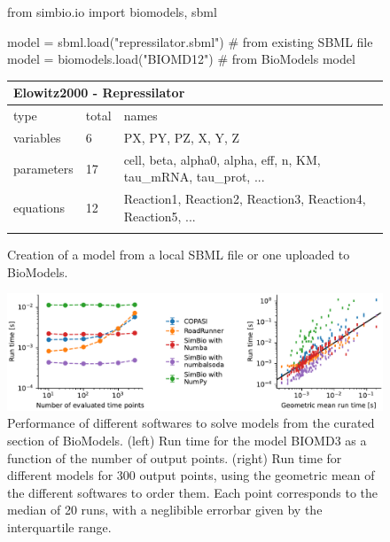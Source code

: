 \documentclass[namedate,numsec,webpdf,modern,large]{oup-authoring-template}
\theoremstyle{thmstyleone}%
\theoremstyle{thmstyletwo}%
\theoremstyle{thmstylethree}%
\newenvironment{CodeInput}{\begin{tcolorbox}[title=input,boxrule=0pt]}{\end{tcolorbox}}
\newenvironment{CodeOutput}{\begin{tcolorbox}[title=output,boxrule=0pt]}{\end{tcolorbox}}
\newcommand{\KeywordTok}[1]{\textcolor[rgb]{0.00,0.13,1.00}{#1}}
\newcommand{\ClassTok}[1]{\textcolor[rgb]{0.27,0.56,0.65}{#1}}
\newcommand{\OperatorTok}[1]{\textcolor[rgb]{0.00,0.00,0.00}{#1}}
\newcommand{\VariableTok}[1]{\textcolor[rgb]{0.00,0.06,0.50}{#1}}
\newcommand{\FunctionTok}[1]{\textcolor[rgb]{0.47,0.37,0.15}{#1}}
\newcommand{\CommentTok}[1]{\textcolor[rgb]{0.00,0.50,0.00}{#1}}
\newcommand{\StringTok}[1]{\textcolor[rgb]{0.70,0.27,0.27}{#1}}
\begin{document}
\begin{figure}[t]
  \centering
  
  \begin{CodeInput}
  \begin{Highlighting}[]
  \KeywordTok{from}\ClassTok{ simbio.io }\KeywordTok{import}\ClassTok{ biomodels, sbml}

  \VariableTok{model }\OperatorTok{=}\ClassTok{ sbml}.\FunctionTok{load}\KeywordTok{(}\StringTok{"repressilator.sbml"}\KeywordTok{)}  \CommentTok{\# from existing SBML file}
  \VariableTok{model }\OperatorTok{=}\ClassTok{ biomodels}.\FunctionTok{load}\KeywordTok{(}\StringTok{"BIOMD12"}\KeywordTok{)}  \CommentTok{\# from BioModels}
  \VariableTok{model}
  \end{Highlighting}
  \end{CodeInput}
    
  \begin{CodeOutput}
      \begin{tabular}{@{}lll@{}}
          \multicolumn{3}{l}{Elowitz2000 - Repressilator} \\
          \toprule
          type & total & names \\
          \midrule
          variables  &  6 & PX, PY, PZ, X, Y, Z \\
          parameters & 17 & cell, beta, alpha0, alpha, eff, n, KM, tau\_mRNA, tau\_prot, ... \\
          equations  & 12 & Reaction1, Reaction2, Reaction3, Reaction4, Reaction5, ... \\
          \botrule
      \end{tabular}
  \end{CodeOutput}
  
  \caption{Creation of a model from a local SBML file or one uploaded to BioModels.}
  \label{fig-simbio-io}
\end{figure}
  
\begin{figure}[t]
  \centering
  \includegraphics[width=\textwidth]{src/performance/figures/performance}
  \caption{
    Performance of different softwares to solve models from the curated section of BioModels.
    (left) Run time for the model BIOMD3 as a function of the number of output points.
    (right) Run time for different models for 300 output points,
    using the geometric mean of the different softwares to order them.
    Each point corresponds to the median of 20 runs,
    with a neglibible errorbar given by the interquartile range.
  }
  \label{fig-runtime}
\end{figure}
\end{document}
